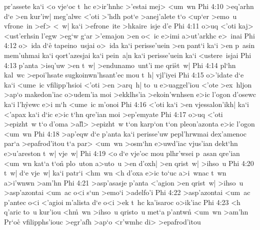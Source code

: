 pr'assete
ka`i
<o
vje`oc
t~hc
e>ir'hnhc
>'estai
mej>
<um~wn\bibvsend
\vs Phi 4:10
>eq'arhn
d`e
>en
kur'iw|
meg'alwc
<'oti
>'hdh
pot`e
>anej'alete
t`o
<up`er
>emo~u
vfrone~in
>ef>
<~w|
ka`i
>efrone~ite
>hkaire~isje
d'e\bibvsend
\vs Phi 4:11
o>uq
<'oti
kaj>
<ust'erhsin
l'egw
>eg`w
g`ar
>'emajon
>en
o<~ic
e>imi
a>ut'arkhc
e>~inai\bibvsend
\vs Phi 4:12
o>~ida
d`e\r{}
tapeino~usjai
o>~ida
ka`i
perisse'uein
>en
pant`i
ka`i
>en
p~asin
mem'uhmai
ka`i
qort'azesjai
ka`i
pein~a|n
ka`i
perisse'uein
ka`i
<ustere~isjai\bibvsend
\vs Phi 4:13
p'anta
>isq'uw
>en
t~w|
>endunamo~unt'i
me
qri\r{s}t~w|\bibvsend
{}
\vs Phi 4:14
pl`hn
kal~wc
>epoi'hsate
sugkoinwn'hsant'ec
mou
t~h|
vjl'iyei\bibvsend
\vs Phi 4:15
o>'idate
d`e
ka`i
<ume~ic
vfilipp'hsioi
<'oti
>en
>arq~h|
to~u
e>uaggel'iou
<'ote
>ex~hljon
>ap`o
makedon'iac
o>udem'ia
moi
>ekklhs'ia
>ekoin'wnhsen
e>ic
l'ogon
d'osewc
ka`i
l'h\r{y}ewc
e>i
m`h
<ume~ic
m'onoi\bibvsend
\vs Phi 4:16
<'oti
ka`i
>en
vjessalon'ikh|
ka`i
<'apax
ka`i
d`ic
e>ic
t`hn
qre'ian
moi
>ep'emyate\bibvsend
\vs Phi 4:17
o>uq
<'oti
>epizht~w
t`o
d'oma
>al\r{l}>
>epizht~w
t`on
karp`on
t`on
pleon'azonta
e>ic
l'ogon
<um~wn\bibvsend
\vs Phi 4:18
>ap'eqw
d`e
p'anta
ka`i
perisse'uw
pepl'hrwmai
dex'amenoc
par`a
>epafrod'itou
t`a
par>
<um~wn
>osm`hn
e>uwd'iac
vjus'ian
dekt`hn
e>u'areston
t~w|
vje~w|\bibvsend
\vs Phi 4:19
<o
d`e
vje'oc
mou
plhr'wsei
p~asan
qre'ian
<um~wn
kat`a
t`on\r{}
plo~uton
a>uto~u
>en
d'oxh|
>en
qrist~w|
>ihso~u\bibvsend
\vs Phi 4:20
t~w|
d`e
vje~w|
ka`i
patr`i
<hm~wn
<h
d'oxa
e>ic
to`uc
a>i~wnac
t~wn
a>i'wnwn
>am'hn\bibvsend
\vs Phi 4:21
>asp'asasje
p'anta
<'agion
>en
qrist~w|
>ihso~u
>asp'azontai
<um~ac
o<i
s`un
>emo`i
>adelfo'i\bibvsend
\vs Phi 4:22
>asp'azontai
<um~ac
p'antec
o<i
<'agioi
m'alista
d`e
o<i
>ek
t~hc
ka'isaroc
o>ik'iac\bibvsend
\vs Phi 4:23
<h
q'aric
to~u
kur'iou
<h\r{m}~wn
>ihso~u
qristo~u
met`a
p'antwn\r{}
<um~wn
>am'hn\bibvsend
Pr`oc\r{}
vfilipphs'iouc
>egr'afh
>ap`o
<r'wmhc
di>
>epafrod'itou\bibvsend
